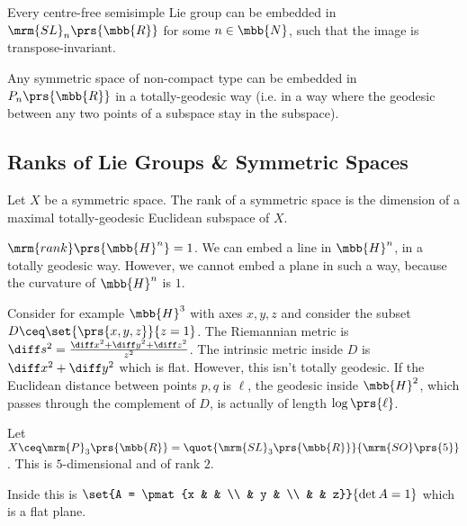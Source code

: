 \documentclass[10pt, twoside]{book}
\begin{document}
\begin{theorem}[Mostow]
Every centre-free semisimple Lie group can be embedded in $\mrm{SL}_n\prs{\mbb{R}}$ for some $n \in \mbb{N}$, such that the image is transpose-invariant.
\end{theorem}

\begin{corollary}
Any symmetric space of non-compact type can be embedded in $P_n\prs{\mbb{R}}$ in a totally-geodesic way (i.e. in a way where the geodesic between any two points of a subspace stay in the subspace).
\end{corollary}

\subsection{Ranks of Lie Groups \& Symmetric Spaces}

\begin{definition}
Let $X$ be a symmetric space. The rank of a symmetric space is the dimension of a maximal totally-geodesic Euclidean subspace of $X$.
\end{definition}

\begin{example}
$\mrm{rank}\prs{\mbb{H}^n} = 1$. We can embed a line in $\mbb{H}^n$, in a totally geodesic way. However, we cannot embed a plane in such a way, because the curvature of $\mbb{H}^n$ is $1$.

Consider for example $\mbb{H}^3$ with axes $x,y,z$ and consider the subset $D \ceq \set{\prs{x,y,z}}{z = 1}$. The Riemannian metric is $\diff s^2 = \frac{\diff x^2 + \diff y^2 + \diff z^2}{z^2}$.
The intrinsic metric inside $D$ is $\diff x^2 + \diff y^2$ which is flat. However, this isn't totally geodesic. If the Euclidean distance between points $p,q$ is $\ell$, the geodesic inside $\mbb{H}^2$, which passes through the complement of $D$, is actually of length $\log\prs{\ell}$. 
\end{example}

\begin{example}
Let $X \ceq \mrm{P}_3\prs{\mbb{R}} = \quot{\mrm{SL}_3\prs{\mbb{R}}}{\mrm{SO}\prs{5}}$.
This is $5$-dimensional and of rank $2$.

Inside this is $\set{A = \pmat{x & & \\ & y & \\ & & z}}{\det A = 1}$ which is a flat plane.
\end{example}
\end{document}
